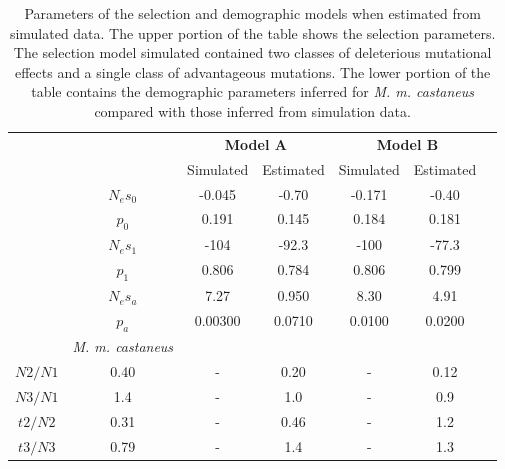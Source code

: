 \begin{table}[h!]
\centering
\caption[Parameters of the selection and demographic models when estimated from simulated data]{Parameters of the selection and demographic models when estimated from simulated data. The upper portion of the table shows the selection parameters. The selection model simulated contained two classes of deleterious mutational effects and a single class of advantageous mutations. The lower portion of the table contains the demographic parameters inferred for \textit{M. m. castaneus} compared with those inferred from simulation data.}
 \begin{tabular}{c c c c c c c} 
 \toprule
	& & 	\multicolumn{2}{c}{\textbf{Model A}}	& \multicolumn{2}{c}{\textbf{Model B}}   \\ 
	& &	Simulated &	Estimated	& Simulated &	Estimated \\ \hline
	&$N_es_0$ &	-0.045	&-0.70 &	-0.171 & 	-0.40 \\
	&$p_0$ &	 0.191	& 0.145	& 0.184	& 0.181 \\
	&$N_es_1$ &	-104	&-92.3&	-100 &	-77.3 \\
	&$p_1$ &	 0.806	&0.784	& 0.806 &	0.799 \\
	&$N_es_a$ & 	7.27	 & 0.950 &	8.30 &	4.91 \\
	&$p_a$ &	 0.00300	&0.0710&	0.0100&	0.0200 \\ \hline
	& \textit{M. m. castaneus} & & & \\ \hline
$N2/N1$	& 0.40	&-	&0.20&	-	&0.12 \\
$N3/N1$	& 1.4	&-	&1.0	&-	&0.9\\
$t2/N2$	& 0.31	&-	&0.46&	-&	1.2\\
$t3/N3$	& 0.79	&-	&1.4	&-	&1.3 \\
\bottomrule

\end{tabular}
\label{tab:CS6}
\end{table}